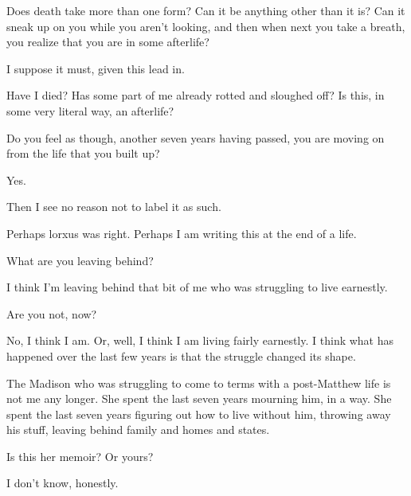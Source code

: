 \label{ally:30}
\begin{paracol}{2}
  \begin{leftcolumn}
\noindent Does death take more than one form? Can it be anything other than it is? Can it sneak up on you while you aren't looking, and then when next you take a breath, you realize that you are in some afterlife?

\begin{ally}
I suppose it must, given this lead in.
\end{ally}
Have I died? Has some part of me already rotted and sloughed off? Is this, in some very literal way, an afterlife?

\begin{ally}
Do you feel as though, another seven years having passed, you are moving on from the life that you built up?
\end{ally}
Yes.

\begin{ally}
Then I see no reason not to label it as such.
\end{ally}
Perhaps lorxus was right. Perhaps I am writing this at the end of a life.

\begin{ally}
What are you leaving behind?
\end{ally}
I think I'm leaving behind that bit of me who was struggling to live earnestly.

\begin{ally}
Are you not, now?
\end{ally}
No, I think I am. Or, well, I think I am living fairly earnestly. I think what has happened over the last few years is that the struggle changed its shape.

The Madison who was struggling to come to terms with a post-Matthew life is not me any longer. She spent the last seven years mourning him, in a way. She spent the last seven years figuring out how to live without him, throwing away his stuff, leaving behind family and homes and states.

\begin{ally}
Is this her memoir? Or yours?
\end{ally}
I don't know, honestly.
  \end{leftcolumn}
\end{paracol}
